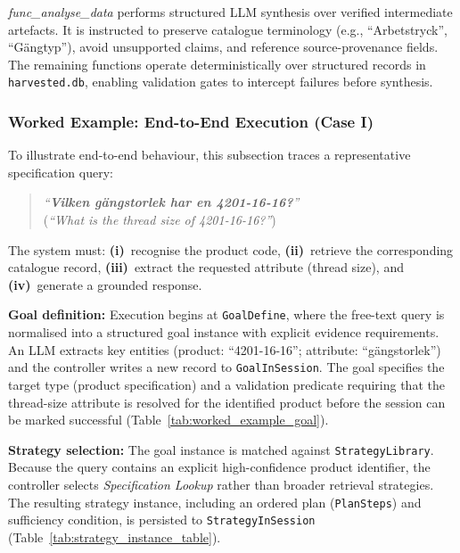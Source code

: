 \documentclass[largeformat]{interact}
\begin{document}
\textit{func\_analyse\_data} performs structured LLM synthesis over verified intermediate artefacts. It is instructed to preserve catalogue terminology (e.g., ``Arbetstryck'', ``G\"angtyp''), avoid unsupported claims, and reference source-provenance fields. The remaining functions operate deterministically over structured records in \texttt{harvested.db}, enabling validation gates to intercept failures before synthesis.

\subsubsection{Worked Example: End-to-End Execution (Case I)}
\label{subsubsec:worked_example_case_I}
To illustrate end-to-end behaviour, this subsection traces a representative specification query:
\begin{quote}
    \centering
    \emph{``\textbf{Vilken g\"angstorlek har en 4201-16-16?}''} \\
    (\textit{``What is the thread size of 4201-16-16?''})
\end{quote}

\noindent The system must:
    \textbf{(i)}~recognise the product code,
    \textbf{(ii)}~retrieve the corresponding catalogue record,
    \textbf{(iii)}~extract the requested attribute (thread size), and
    \textbf{(iv)}~generate a grounded response.
    
\noindent \textbf{Goal definition:}
Execution begins at \texttt{GoalDefine}, where the free-text query is normalised into a structured goal instance with explicit evidence requirements. An LLM extracts key entities (product: ``4201-16-16''; attribute: ``g\"angstorlek'') and the controller writes a new record to \texttt{GoalInSession}. The goal specifies the target type (product specification) and a validation predicate requiring that the thread-size attribute is resolved for the identified product before the session can be marked successful (Table~\ref{tab:worked_example_goal}).

\noindent \textbf{Strategy selection:}
The goal instance is matched against \texttt{StrategyLibrary}. Because the query contains an explicit high-confidence product identifier, the controller selects \textit{Specification Lookup} rather than broader retrieval strategies. The resulting strategy instance, including an ordered plan (\texttt{PlanSteps}) and sufficiency condition, is persisted to \texttt{StrategyInSession} (Table~\ref{tab:strategy_instance_table}).
\end{document}
